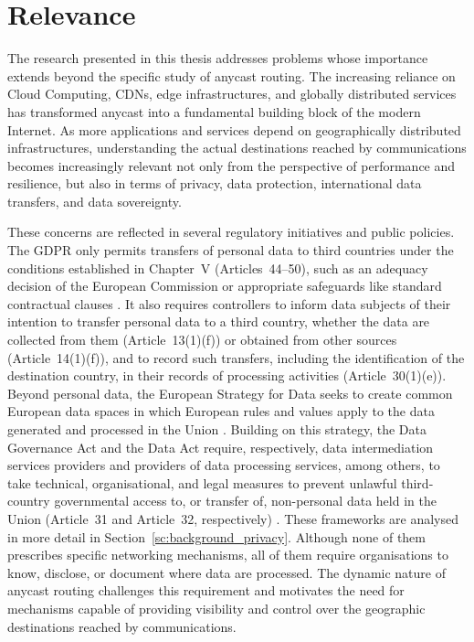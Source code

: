 \section{Relevance}
\label{sc:introduction_relevance}

The research presented in this thesis addresses problems whose importance extends beyond the specific study of anycast routing. The increasing reliance on Cloud Computing, CDNs, edge infrastructures, and globally distributed services has transformed anycast into a fundamental building block of the modern Internet. As more applications and services depend on geographically distributed infrastructures, understanding the actual destinations reached by communications becomes increasingly relevant not only from the perspective of performance and resilience, but also in terms of privacy, data protection, international data transfers, and data sovereignty.

These concerns are reflected in several regulatory initiatives and public policies. The GDPR only permits transfers of personal data to third countries under the conditions established in Chapter~V (Articles~44--50), such as an adequacy decision of the European Commission or appropriate safeguards like standard contractual clauses \cite{REGULATIONSRelevance}. It also requires controllers to inform data subjects of their intention to transfer personal data to a third country, whether the data are collected from them (Article~13(1)(f)) or obtained from other sources (Article~14(1)(f)), and to record such transfers, including the identification of the destination country, in their records of processing activities (Article~30(1)(e)). Beyond personal data, the European Strategy for Data seeks to create common European data spaces in which European rules and values apply to the data generated and processed in the Union \cite{COMMUNICATIONData}. Building on this strategy, the Data Governance Act and the Data Act require, respectively, data intermediation services providers and providers of data processing services, among others, to take technical, organisational, and legal measures to prevent unlawful third-country governmental access to, or transfer of, non-personal data held in the Union (Article~31 and Article~32, respectively) \cite{2022DataActb, 2022DataAct}. These frameworks are analysed in more detail in Section~\ref{sc:background_privacy}. Although none of them prescribes specific networking mechanisms, all of them require organisations to know, disclose, or document where data are processed. The dynamic nature of anycast routing challenges this requirement and motivates the need for mechanisms capable of providing visibility and control over the geographic destinations reached by communications.

